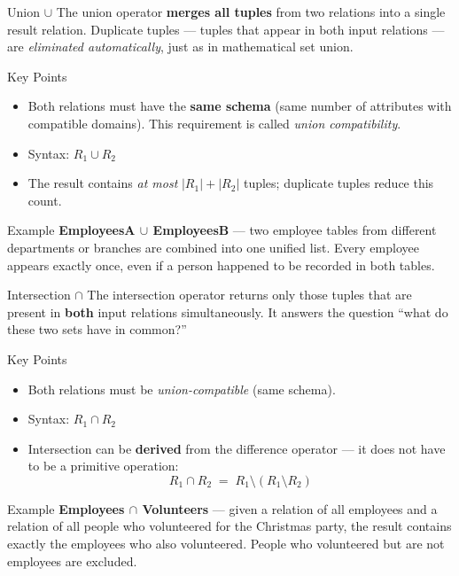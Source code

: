 \begin{frame}{Union $\cup$}
  The union operator \textbf{merges all tuples} from two relations into a
  single result relation.  Duplicate tuples — tuples that appear in both
  input relations — are \emph{eliminated automatically}, just as in
  mathematical set union.

  \begin{block}{Key Points}
    \begin{itemize}
      \item Both relations must have the \textbf{same schema} (same number
            of attributes with compatible domains).  This requirement is
            called \emph{union compatibility}.
      \item Syntax: $R_1 \cup R_2$
      \item The result contains \emph{at most} $|R_1| + |R_2|$ tuples;
            duplicate tuples reduce this count.
    \end{itemize}
  \end{block}

  \begin{examples}{Example}
    \textbf{EmployeesA $\cup$ EmployeesB} — two employee tables from
    different departments or branches are combined into one unified list.
    Every employee appears exactly once, even if a person happened to be
    recorded in both tables.
  \end{examples}
\end{frame}

\begin{frame}{Intersection $\cap$}
  The intersection operator returns only those tuples that are present in
  \textbf{both} input relations simultaneously.  It answers the question
  ``what do these two sets have in common?''

  \begin{block}{Key Points}
    \begin{itemize}
      \item Both relations must be \emph{union-compatible} (same schema).
      \item Syntax: $R_1 \cap R_2$
      \item Intersection can be \textbf{derived} from the difference
            operator — it does not have to be a primitive operation:
            \[
              R_1 \cap R_2 \;=\; R_1 \setminus (R_1 \setminus R_2)
            \]
    \end{itemize}
  \end{block}

  \begin{examples}{Example}
    \textbf{Employees $\cap$ Volunteers} — given a relation of all
    employees and a relation of all people who volunteered for the
    Christmas party, the result contains exactly the employees who also
    volunteered.  People who volunteered but are not employees are
    excluded.
  \end{examples}
\end{frame}

